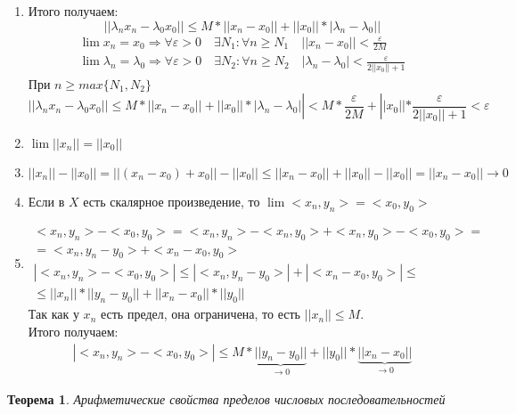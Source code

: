\documentclass[12pt,letterpaper]{report}
\makeatletter
\newtheorem{theorem}{Теорема}
\renewenvironment{proof}[1][\proofname]{%
   \par\pushQED{\qed}\normalfont%
   \topsep6\p@\@plus6\p@\relax
   \trivlist\item[\hskip\labelsep\bfseries#1\@addpunct{.}]%
   \ignorespaces
}{%
   \popQED\endtrivlist\@endpefalse
}
\makeatother
\begin{document}
\begin{enumerate}
\begin{proof}
            Итого получаем:
            \[ || \lambda_nx_n - \lambda_0x_0 || \leqslant M*||x_n - x_0|| + ||x_0||*|\lambda_n - \lambda_0|| \]
            \begin{gather*}
                \lim x_n = x_0 \Rightarrow \forall \varepsilon > 0 \quad \exists N_1 : \forall n \geqslant N_1 \quad ||x_n - x_0|| < \frac{\varepsilon}{2M} \\
                \lim \lambda_n = \lambda_0 \Rightarrow \forall \varepsilon > 0 \quad \exists N_2 : \forall n \geqslant N_2 \quad |\lambda_n - \lambda_0| < \frac{\varepsilon}{2||x_0||+1}
            \end{gather*}
            При $n \geqslant max\{N_1, N_2\}$
            \[|| \lambda_nx_n - \lambda_0x_0 || \leqslant M*||x_n - x_0|| + ||x_0||*|\lambda_n - \lambda_0|| < M * \frac{\varepsilon}{2M} + ||x_0|| * \frac{\varepsilon}{2||x_0||+1} < \varepsilon\]
    \end{proof}
    \item $\lim ||x_n|| = ||x_0||$
    \begin{proof}
            \[ ||x_n|| - ||x_0|| = ||(x_n - x_0) + x_0|| - ||x_0|| \leqslant ||x_n - x_0|| + ||x_0|| - ||x_0|| = ||x_n - x_0|| \to 0 \]
    \end{proof}
    \item Если в $X$ есть скалярное произведение, то $\lim<x_n, y_n> = <x_0, y_0>$
    \begin{proof}
        \begin{gather*}
            <x_n, y_n> - <x_0, y_0> = <x_n, y_n> - <x_n, y_0> + <x_n, y_0> - <x_0, y_0> =  \\
            = <x_n, y_n - y_0> + <x_n - x_0, y_0> \\
            | <x_n, y_n> - <x_0, y_0> | \leqslant | <x_n, y_n - y_0> | + | <x_n - x_0, y_0> | \leqslant \\
            \leqslant ||x_n||*||y_n-y_0||+||x_n-x_0||*||y_0||
        \end{gather*}
        Так как у $x_n$ есть предел, она ограничена, то есть $||x_n|| \leqslant M$. \\
        Итого получаем:
        \begin{gather*}
            | <x_n, y_n> - <x_0, y_0> | \leqslant M*\underbrace{||y_n - y_0||}_{\to 0}+||y_0||*\underbrace{||x_n - x_0||}_{\to 0}
        \end{gather*}
    \end{proof}
\end{enumerate}
\begin{theorem} Арифметические свойства пределов числовых последовательностей \end{theorem}
\end{document}
